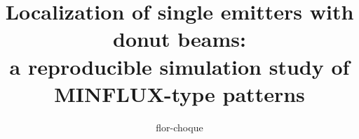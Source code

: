 \documentclass[aps,pra,twocolumn,superscriptaddress,floatfix,longbibliography]{revtex4-2}
\begin{document}
\title{Localization of single emitters with donut beams:\\
a reproducible simulation study of MINFLUX-type patterns}

\author{flor-choque}
\noaffiliation



\maketitle














\appendix



\end{document}
